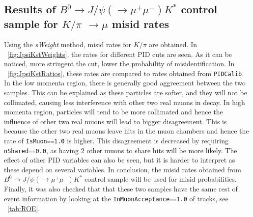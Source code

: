 \subsection{Results of $B^{0} \rightarrow J/\psi(\rightarrow \mu^{+} \mu^{-}) K^{*}$ control sample for $K/\pi$ $\rightarrow \mu$ misid rates }
Using the \textit{sWeight} method, misid rates for $K/\pi$ are obtained.
In ~\autoref{fig:JpsiKstWeights}, the rates for different PID cuts are seen.
 As it can be noticed, more stringent the cut, lower the probability of misidentification. 
In ~\autoref{fig:JpsiKstRatios}, these rates are compared to rates obtained from \texttt{PIDCalib}.
In the low momenta region, there is generally good aggreement between the two samples. This can be explained as these particles are softer, and they will not be collimated, causing less interference with other two real muons in decay. In high momenta region, particles will tend to be more collimated and hence the influence of other two real muons will lead to bigger disagreement. This is because the other two real muons leave hits in the muon chambers and hence the rate of \texttt{IsMuon==1.0} is higher. This disagreement is decreased by requiring \texttt{nShared==0.0}, as having 2 other muons to share hits will be more likely. The effect of other PID variables can also be seen, but it is harder to interpret as these depend on several variables.
\newline In conclusion, the misid rates obtained from $B^{0} \rightarrow J/\psi(\rightarrow \mu^{+} \mu^{-}) K^{*}$ control sample will be used for misid probabilities.
\newline Finally, it was also checked that that these two samples have the same rest of event information by looking at the \texttt{InMuonAcceptance==1.0} of tracks, see ~\autoref{tab:ROE}.

